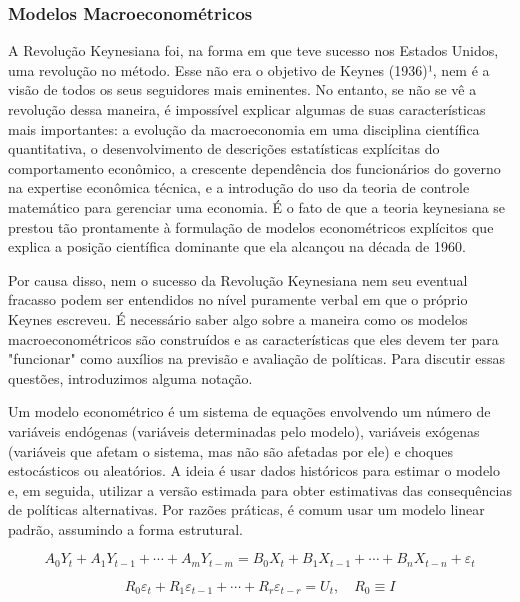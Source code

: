 \documentclass[a4paper,12pt]{article}[abntex2]
\begin{document}
\subsubsection{\textbf{Modelos Macroeconométricos}}

A Revolução Keynesiana foi, na forma em que teve sucesso nos Estados Unidos, uma revolução no método. Esse não era o objetivo de Keynes (1936)¹, nem é a visão de todos os seus seguidores mais eminentes. No entanto, se não se vê a revolução dessa maneira, é impossível explicar algumas de suas características mais importantes: a evolução da macroeconomia em uma disciplina científica quantitativa, o desenvolvimento de descrições estatísticas explícitas do comportamento econômico, a crescente dependência dos funcionários do governo na expertise econômica técnica, e a introdução do uso da teoria de controle matemático para gerenciar uma economia. É o fato de que a teoria keynesiana se prestou tão prontamente à formulação de modelos econométricos explícitos que explica a posição científica dominante que ela alcançou na década de 1960.

Por causa disso, nem o sucesso da Revolução Keynesiana nem seu eventual fracasso podem ser entendidos no nível puramente verbal em que o próprio Keynes escreveu. É necessário saber algo sobre a maneira como os modelos macroeconométricos são construídos e as características que eles devem ter para "funcionar" como auxílios na previsão e avaliação de políticas. Para discutir essas questões, introduzimos alguma notação.

Um modelo econométrico é um sistema de equações envolvendo um número de variáveis endógenas (variáveis determinadas pelo modelo), variáveis exógenas (variáveis que afetam o sistema, mas não são afetadas por ele) e choques estocásticos ou aleatórios. A ideia é usar dados históricos para estimar o modelo e, em seguida, utilizar a versão estimada para obter estimativas das consequências de políticas alternativas. Por razões práticas, é comum usar um modelo linear padrão, assumindo a forma estrutural.

\begin{equation}
    A_0 Y_t + A_1 Y_{t-1} + \cdots + A_m Y_{t-m} = B_0 X_t + B_1 X_{t-1} + \cdots + B_n X_{t-n} + \varepsilon_t
\end{equation}

\begin{equation}
    R_0 \varepsilon_t + R_1 \varepsilon_{t-1} + \cdots + R_r \varepsilon_{t-r} = U_t, \quad R_0 \equiv I
\end{equation}
\end{document}
